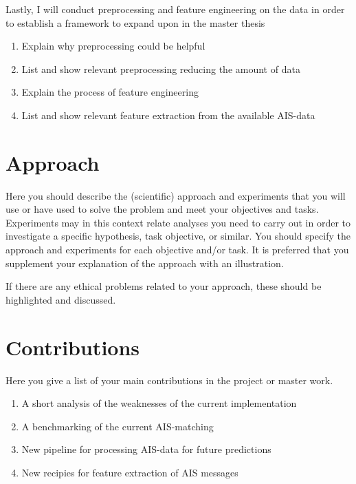 Lastly, I will conduct preprocessing and feature engineering on the data in order to establish a framework to expand upon in the master thesis
\begin{enumerate}
	\item Explain why preprocessing could be helpful
	\item List and show relevant preprocessing reducing the amount of data
	\item Explain the process of feature engineering
	\item List and show relevant feature extraction from the available AIS-data
\end{enumerate}


\section{Approach}
\label{sec:approach}
\begin{info}
	Here you should describe the (scientific) approach and experiments that you will use or have used to solve the problem and meet your objectives and tasks. Experiments may in this context relate analyses you need to carry out in order to investigate a specific hypothesis, task objective, or similar. You should specify the approach and experiments for each objective and/or task. It is preferred that you supplement your explanation of the approach with an illustration.

	If there are any ethical problems related to your approach, these should be highlighted and discussed.
\end{info}



\section{Contributions}
\label{sec:contributions}
\begin{info}
	Here you give a list of your main contributions in the project or master work.
\end{info}
\begin{enumerate}
	\item A short analysis of the weaknesses of the current implementation
	\item A benchmarking of the current AIS-matching
	\item New pipeline for processing AIS-data for future predictions
	\item New recipies for feature extraction of AIS messages
\end{enumerate}

